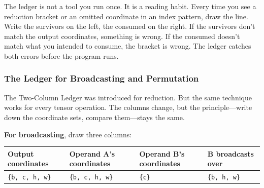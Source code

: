 \documentclass[11pt,titlepage]{article}
\begin{document}
The ledger is not a tool you run once. It is a reading habit. Every time
you see a reduction bracket or an omitted coordinate in an index
pattern, draw the line. Write the survivors on the left, the consumed on
the right. If the survivors don't match the output coordinates,
something is wrong. If the consumed doesn't match what you intended to
consume, the bracket is wrong. The ledger catches both errors before the
program runs.

\vspace{2em}

\hypertarget{the-ledger-for-broadcasting-and-permutation}{%
\subsubsection{The Ledger for Broadcasting and
Permutation}\label{the-ledger-for-broadcasting-and-permutation}}

The Two-Column Ledger was introduced for reduction. But the same
technique works for every tensor operation. The columns change, but the
principle---write down the coordinate sets, compare them---stays the
same.

\textbf{For broadcasting}, draw three columns:

\begin{longtable}[]{@{}llll@{}}
\toprule
\begin{minipage}[b]{0.22\columnwidth}\raggedright
Output coordinates\strut
\end{minipage} & \begin{minipage}[b]{0.22\columnwidth}\raggedright
Operand A's coordinates\strut
\end{minipage} & \begin{minipage}[b]{0.22\columnwidth}\raggedright
Operand B's coordinates\strut
\end{minipage} & \begin{minipage}[b]{0.22\columnwidth}\raggedright
B broadcasts over\strut
\end{minipage}\tabularnewline
\midrule
\endhead
\begin{minipage}[t]{0.22\columnwidth}\raggedright
\texttt{\{b,\ c,\ h,\ w\}}\strut
\end{minipage} & \begin{minipage}[t]{0.22\columnwidth}\raggedright
\texttt{\{b,\ c,\ h,\ w\}}\strut
\end{minipage} & \begin{minipage}[t]{0.22\columnwidth}\raggedright
\texttt{\{c\}}\strut
\end{minipage} & \begin{minipage}[t]{0.22\columnwidth}\raggedright
\texttt{\{b,\ h,\ w\}}\strut
\end{minipage}\tabularnewline
\bottomrule
\end{longtable}
\end{document}
